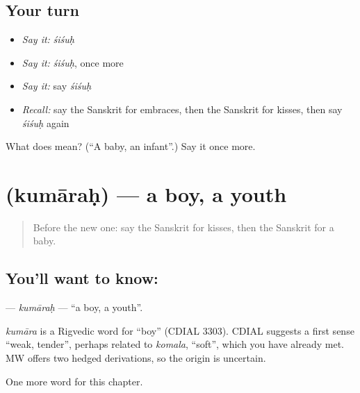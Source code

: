 \subsection*{Your turn}
\begin{itemize}
\raggedright
  \item \emph{Say it:} \emph{śiśuḥ}
  \item \emph{Say it:} \emph{śiśuḥ}, once more
  \item \emph{Say it:} say \emph{śiśuḥ}
  \item \emph{Recall:} say the Sanskrit for embraces, then the Sanskrit for kisses, then say \emph{śiśuḥ} again
\end{itemize}

\begin{tcolorbox}[breakable,colback=teal!4,colframe=teal!35!black,title={Before you move on}]
What does  mean? (\textquotedblleft{}A baby, an infant\textquotedblright{}.) Say it once more.
\end{tcolorbox}
\section[\texorpdfstring{\sk{कुमारः} (kumāraḥ)}{कुमारः (kumāraḥ)}]{ (kumāraḥ) — a boy, a youth}

\label{lesson:SA-C236-kumarah}



\begin{quote}
Before the new one: say the Sanskrit for kisses, then the Sanskrit for a baby.
\end{quote}

\subsection*{You'll want to know: }
\textbf{} — \emph{kumāraḥ} — \textquotedblleft{}a boy, a youth\textquotedblright{}.

\begin{cousinweb}
\emph{kumāra} is a Rigvedic word for \textquotedblleft{}boy\textquotedblright{} (CDIAL 3303). CDIAL suggests a first sense \textquotedblleft{}weak, tender\textquotedblright{}, perhaps related to \emph{komala}, \textquotedblleft{}soft\textquotedblright{}, which you have already met. MW offers two hedged derivations, so the origin is uncertain.
\end{cousinweb}

\begin{grammarlens}[title={What you've built}]
One more word for this chapter.
\end{grammarlens}

